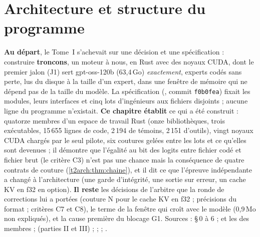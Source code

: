 


\chapter{Architecture et structure du programme}\label{t2arch:ch}

\begin{origine}
\textbf{Au départ}, le Tome~I s'achevait sur une décision et une spécification : construire \textbf{troncons}, un moteur à nous, en Rust avec des noyaux CUDA, dont le premier jalon (J1) sert gpt-oss-120b (63,4\,Go) \emph{exactement}, experts codés sans perte, lus du disque à la taille d'un expert, dans une fenêtre de mémoire qui ne dépend pas de la taille du modèle. La spécification (, commit \texttt{f0b0fea}) fixait les modules, leurs interfaces et cinq lots d'ingénieurs aux fichiers disjoints ; aucune ligne du programme n'existait.
\textbf{Ce chapitre établit} ce qui a été construit : quatorze membres d'un espace de travail Rust (onze bibliothèques, trois exécutables, 15\,655 lignes de code, 2\,194 de témoins, 2\,151 d'outils), vingt noyaux CUDA chargés par le seul pilote, six coutures gelées entre les lots et ce qu'elles sont devenues ; il démontre que l'égalité au bit des logits entre fichier codé et fichier brut (le critère C3) n'est pas une chance mais la conséquence de quatre contrats de couture (\cref{t2arch:thm:chaine}), et il dit ce que l'épreuve indépendante a changé à l'architecture (une garde d'intégrité, une sortie sur erreur, un cache KV en f32 en option).
\textbf{Il reste} les décisions de l'arbitre que la ronde de corrections lui a portées (couture N pour le cache KV en f32 ; précisions du format ; critères C7 et C8), le terme de la fenêtre qui croît avec le modèle (0,9\,Mo non expliqués), et la cause première du blocage G1.
Sources :  §\,0 à 6 ;  et les  des membres ;  (parties II et III) ;  ;  ; .
\end{origine}

